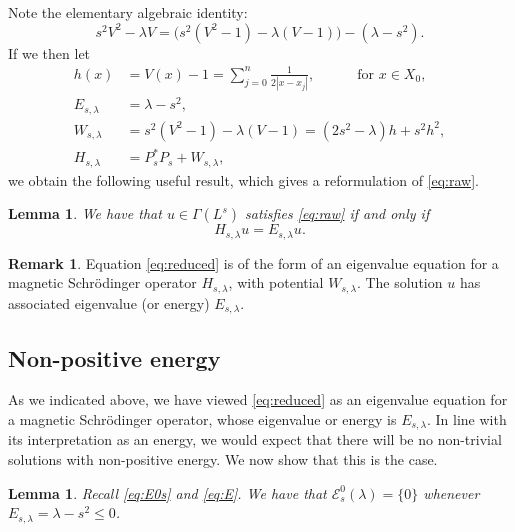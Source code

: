 \documentclass{article}
\newtheorem{lem}[thm]{Lemma}
\theoremstyle{definition}
\newtheorem{rmk}[thm]{Remark}
\numberwithin{thm}{section}
\numberwithin{equation}{section}
\begin{document}
Note  the elementary algebraic identity: 
\begin{equation}
      s^2V^2-\lambda V
        =\bigl(s^2(V^2-1)-\lambda(V-1)\bigr)-(\lambda-s^2).  
\end{equation}
If we then let
    \begin{align}
\label{eq:h}
 h(x)&=V(x)-1=\sum_{j=0}^n\frac{1}{2|x-x_j|},\qquad\quad\! \text{for $x\in X_0$,}\\
\label{eq:E}
        E_{s,\lambda}&=\lambda-s^2,\\
\label{eq:W}
        W_{s,\lambda}&=s^2(V^2-1)-\lambda(V-1)=(2s^2-\lambda)h+s^2h^2,\\
\label{eq:Hs}   H_{s,\lambda}&=P_s^*P_s+W_{s,\lambda},
\end{align}
we obtain the following useful result, which gives a reformulation of \eqref{eq:raw}.

\begin{lem} We have that $u\in\Gamma(L^s)$ satisfies \eqref{eq:raw} if and only if
\begin{equation}\label{eq:reduced}
        H_{s,\lambda}u=E_{s,\lambda}u.
\end{equation}
\end{lem}

\begin{rmk}
    Equation \eqref{eq:reduced} is of the form of an eigenvalue equation for a magnetic Schr\"odinger operator $H_{s,\lambda}$, with potential $W_{s,\lambda}$.  The solution $u$ has associated eigenvalue (or energy) $E_{s,\lambda}$.   
\end{rmk}


\subsection{Non-positive energy}

As we indicated above, we have viewed \eqref{eq:reduced} as an eigenvalue equation for a magnetic Schr\"odinger operator, whose eigenvalue or energy is $E_{s,\lambda}$.  In line with its interpretation as an energy, we would expect that there will be no non-trivial solutions with non-positive energy.  We now show that this is the case.

\begin{lem}\label{lem:non.pos.Esl}
 Recall   \eqref{eq:E0s} and \eqref{eq:E}.   We have that $\mathcal{E}^0_{s}(\lambda)=\{0\}$ whenever $E_{s,\lambda}=\lambda-s^2\leq 0$.
\end{lem}
\end{document}
